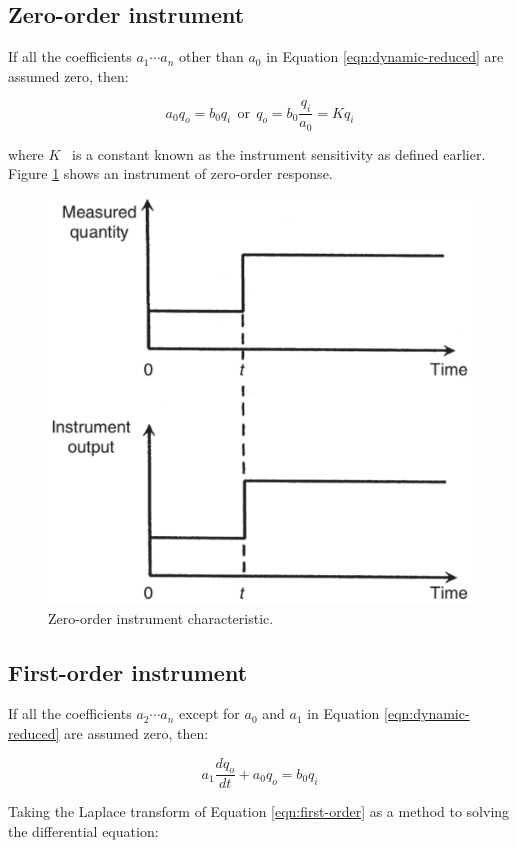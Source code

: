 \documentclass[a4paper,11pt]{book}
\begin{document}
\subsection*{Zero-order instrument}

If all the coefficients $a_1 \cdots a_n$ other than $a_0$ in Equation \ref{eqn:dynamic-reduced} are assumed zero, then: 

\begin{equation}\label{eqn:zero-order}
a_0 q_o = b_0 q_i ~~\text{or}~~ q_o = b_0 \frac{q_i}{a_0} = K q_i 
\end{equation}

where $K$~ is a constant known as the instrument sensitivity as defined earlier. Figure \ref{fig:zero-order} shows an instrument of zero-order response.

\begin{figure}[h!]\label{fig:zero-order}
\centering
  \includegraphics[width=0.7\linewidth]{zero-order}
  \caption{Zero-order instrument characteristic.} 
\end{figure}


\subsection*{First-order instrument}

If all the coefficients $a_2 \cdots a_n$ except for $a_0$ and $a_1$ in Equation \ref{eqn:dynamic-reduced} are assumed zero, then: 

\begin{equation}\label{eqn:first-order}
a_1 \frac{dq_o}{dt} + a_0 q_o = b_0 q_i  
\end{equation}

Taking the Laplace transform of Equation \ref{eqn:first-order} as a method to solving the differential equation:
\end{document}
